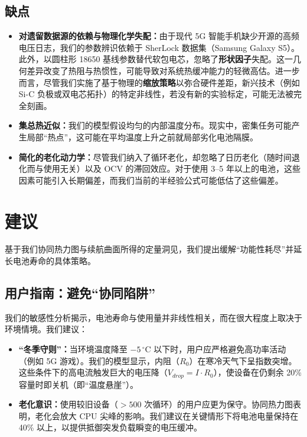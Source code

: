 \documentclass[11pt,a4paper]{ctexart}
\begin{document}
\subsection{缺点}

\begin{itemize}[leftmargin=1.6em,itemsep=0.4em]
\item \textbf{对遗留数据源的依赖与物理化学失配：}由于现代 5G 智能手机缺少开源的高频电压日志，我们的参数辨识依赖于 SherLock 数据集（Samsung Galaxy S5）。此外，以圆柱形 18650 基线参数替代软包电芯，忽略了\textbf{形状因子}失配。这一几何差异改变了热阻与热惯性，可能导致对系统热缓冲能力的轻微高估。进一步而言，尽管我们实施了基于物理的\textbf{缩放策略}以弥合硬件差距，新兴技术（例如 Si-C 负极或双电芯拓扑）的特定非线性，若没有新的实验标定，可能无法被完全刻画。
\item \textbf{集总热近似：}我们的模型假设均匀的内部温度分布。现实中，密集任务可能产生局部“热点”，这可能在平均温度上升之前就局部劣化电池隔膜。
\item \textbf{简化的老化动力学：}尽管我们纳入了循环老化，却忽略了日历老化（随时间退化而与使用无关）以及 OCV 的滞回效应。对于使用 3--5 年以上的电池，这些因素可能引入长期偏差，而我们当前的半经验公式可能低估了这些偏差。
\end{itemize}

\section{建议}

基于我们协同热力图与续航曲面所得的定量洞见，我们提出缓解“功能性耗尽”并延长电池寿命的具体策略。

\subsection{用户指南：避免“协同陷阱”}

我们的敏感性分析揭示，电池寿命与使用量并非线性相关，而在很大程度上取决于环境情境。我们建议：

\begin{itemize}[leftmargin=1.6em,itemsep=0.3em]
\item \textbf{“冬季守则”：}当环境温度降至 $-5\,^{\circ}\mathrm{C}$ 以下时，用户应严格避免高功率活动（例如 5G 游戏）。我们的模型显示，内阻（$R_0$）在寒冷天气下呈指数突增。这些条件下的高电流触发巨大的电压降（$V_{drop}=I\cdot R_0$），使设备在仍剩余 20\% 容量时即关机（即“温度悬崖”）。
\item \textbf{老化意识：}使用较旧设备（$>500$ 次循环）的用户应更为保守。协同热力图表明，老化会放大 CPU 尖峰的影响。我们建议在关键情形下将电池电量保持在 40\% 以上，以提供抵御突发负载瞬变的电压缓冲。
\end{itemize}
\end{document}
